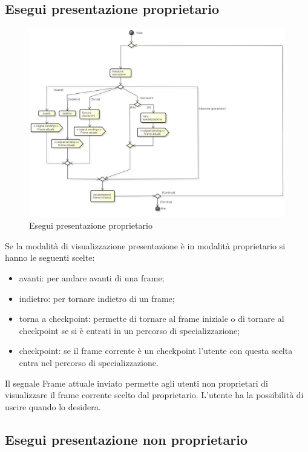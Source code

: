 \subsection{Esegui presentazione proprietario}

\begin{figure}[h!]
		\centering
		\includegraphics[scale=.2]{img/Esegui_presentazione_proprietario.jpg}
		\caption{Esegui presentazione proprietario}
		\label{fig:ModelloSpy}
\end{figure}

Se la modalità di visualizzazione presentazione è in modalità proprietario si hanno le seguenti scelte: 
\begin{itemize}
\item
avanti: per andare avanti di una frame; 
\item 
indietro: per tornare indietro di un frame;
\item torna a checkpoint: permette di tornare al frame iniziale o di tornare al checkpoint se si è entrati in un percorso di specializzazione; 
\item checkpoint: se il frame corrente è un checkpoint l'utente con questa scelta entra nel percorso di specializzazione.
\end{itemize}
Il segnale Frame attuale inviato permette agli utenti non proprietari di visualizzare il frame corrente scelto dal proprietario.
L'utente ha la possibilità di uscire quando lo desidera.

\subsection{Esegui presentazione non proprietario}

